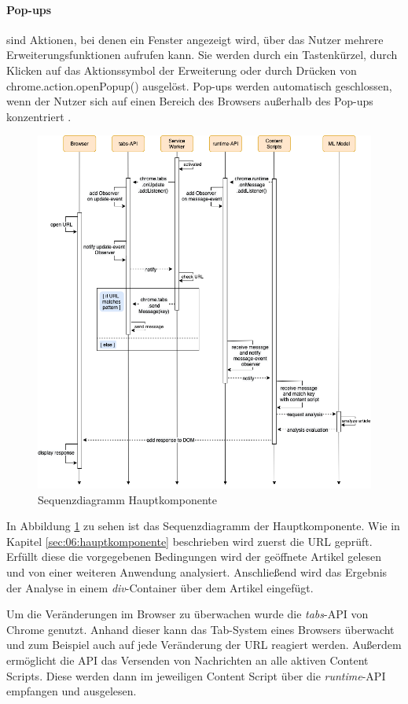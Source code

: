\paragraph{Pop-ups} sind Aktionen, bei denen ein Fenster angezeigt wird, über das Nutzer mehrere Erweiterungsfunktionen aufrufen kann. 
Sie werden durch ein Tastenkürzel, durch Klicken auf das Aktionssymbol der Erweiterung oder durch Drücken von chrome.action.openPopup() ausgelöst. 
Pop-ups werden automatisch geschlossen, wenn der Nutzer sich auf einen Bereich des Browsers außerhalb des Pop-ups konzentriert \cite{chrome2025popups}.

\begin{figure}[htbp]
    \begin{center}
        \includegraphics[scale=0.5]{diagrams/hauptkomponente_sequenzdiagramm.png}
        \caption{\label{fig:seq_hauptkomponente} Sequenzdiagramm Hauptkomponente}
    \end{center}
\end{figure}

In Abbildung \ref{fig:seq_hauptkomponente} zu sehen ist das Sequenzdiagramm der Hauptkomponente. Wie in Kapitel \ref{sec:06:hauptkomponente} beschrieben
wird zuerst die URL geprüft. Erfüllt diese die vorgegebenen Bedingungen wird der geöffnete Artikel gelesen und von einer weiteren Anwendung
analysiert. Anschließend wird das Ergebnis der Analyse in einem \textit{div}-Container über dem Artikel eingefügt.

Um die Veränderungen im Browser zu überwachen wurde die \textit{tabs}-API von Chrome genutzt. Anhand dieser kann das Tab-System eines Browsers überwacht
und zum Beispiel auch auf jede Veränderung der URL reagiert werden.
Außerdem ermöglicht die API das Versenden von Nachrichten an alle aktiven Content Scripts. Diese werden dann im jeweiligen Content Script über die
\textit{runtime}-API empfangen und ausgelesen.


